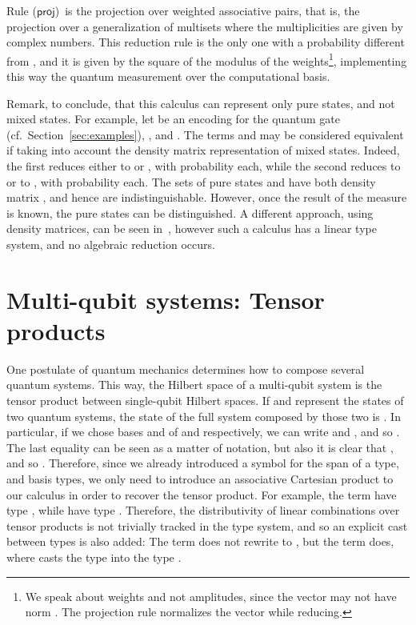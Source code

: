 \documentclass[preprint]{elsarticle}
\newcommand\s[1]{\ensuremath{\mathsf{#1}}}
\newcommand\rproj{(\s{proj})}
\begin{document}
Rule \rproj\ is the projection over weighted associative pairs, that
is, the projection over a generalization of multisets where the multiplicities
are given by complex numbers. This reduction rule is the only one with a
probability different from , and it is given by the square of the modulus of
the weights\footnote{We speak about weights and not amplitudes, since the vector
  may not have norm . The projection rule normalizes the vector while
  reducing.}, implementing this way the quantum measurement over the
computational basis.

Remark, to conclude, that this calculus can represent only pure states, and not
mixed states. For example, let  be an encoding for the quantum  gate
(cf.~Section~\ref{sec:examples}), , and . The terms  and  may be considered equivalent if taking into account the
density matrix representation of mixed states. Indeed, the first reduces either
to  or , with probability  each, while the second
reduces to  or to , with probability  each. The sets
of pure states  and  have both density matrix , and hence are
indistinguishable. However, once the result of the measure is known, the pure
states can be distinguished. A different approach, using density matrices, can
be seen in~\cite{DiazcaroAPLAS17}, however such a calculus has a linear type
system, and no algebraic reduction occurs.

\section{Multi-qubit systems: Tensor products}\label{sec:tensor}
\label{sec:TRS}

One postulate of quantum mechanics determines how to compose several quantum
systems. This way, the Hilbert space of a multi-qubit system is the tensor
product between single-qubit Hilbert spaces. If  and
 represent the states of two quantum systems, the state
of the full system composed by those two is . In particular, if we chose bases  and
 of  and  respectively, we can write
 and
, and so
. The last equality can be
seen as a matter of notation, but also it is clear that , and so . Therefore, since we already introduced a
symbol for the span of a type, and basis types, we only need to introduce an associative
Cartesian product to our calculus in order to recover the tensor product. For
example, the term  have type , while  have type .
Therefore, the distributivity of linear combinations over tensor products is not
trivially tracked in the type system, and so an explicit cast between types is
also added: The term  does not rewrite to , but the term  does, where  casts the type  into the type .
\end{document}
